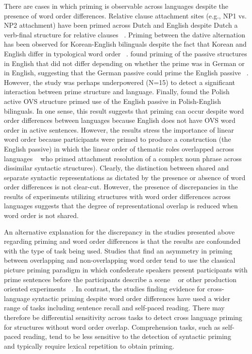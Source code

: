 There are cases in which priming is observable across languages despite the presence of word order differences. Relative clause attachment sites (e.g., NP1 vs. NP2 attachment) have been primed across Dutch and English despite Dutch a verb-final structure for relative clauses ~\citep{Desmet2006}. Priming between the dative alternation has been observed for Korean-English bilinguals despite the fact that Korean and English differ in typological word order ~\citep[Korean has SOV word order while English has SVO word order;][]{Shin2009}.  \citet{Weber2009} found priming of the passive structures in English that did not differ depending on whether the prime was in German or in English, suggesting that the German passive could prime the English passive ~\citep[in contrast to][]{Loebell2003}. However, the study was perhaps underpowered (N=15) to detect a significant interaction between prime structure and language. Finally,  \citet{Fleischer2012} found the Polish active OVS structure primed use of the English passive in Polish-English bilinguals. In one sense, this result suggests that priming can occur despite word order differences between languages because English does not have OVS word order in active sentences. However, the results stress the importance of linear word order because participants were primed to produce a construction (the English passive) in which the linear order of thematic roles overlapped across languages ~\citep[the passive and OVS both place stress on the grammatical patient by fronting it; see also][]{Loncke2011} who primed attachment resolution of a complex noun phrase across dissimilar syntactic structures). Clearly, the distinction between shared and separate syntactic representations as dictated by the presence or absence of word order differences is not clear-cut. However, the presence of discrepancies in the results of experiments utilizing structures with word order differences across languages suggests that the degree of representational overlap is reduced when word order is not shared.

An alternative explanation for the discrepancy in the studies presented above regarding priming and word order differences is that the results are confounded with the type of task being used. Studies that find an asymmetry in priming between overlapping and non-overlapping word order tend to use the classical picture priming paradigm in which confederate speakers present participants with prime sentences before the participants describe a scene ~\citep{Bernolet2007, Loebell2003} or other production oriented experiments ~\citep{Salamoura2007}. In contrast, the studies finding evidence for cross-language syntactic priming despite word order differences have used a wider range of tasks including sentence recall and self-paced reading. There may therefore be differential sensitivity across tasks to detect cross language priming for structures without word order overlap. Comprehension tasks, such as self-paced reading, tend to be less sensitive to the detection of syntactic priming ~\citep{Ledoux2007, Thothathiri2008} and typically require lexical repetition to obtain priming. 

